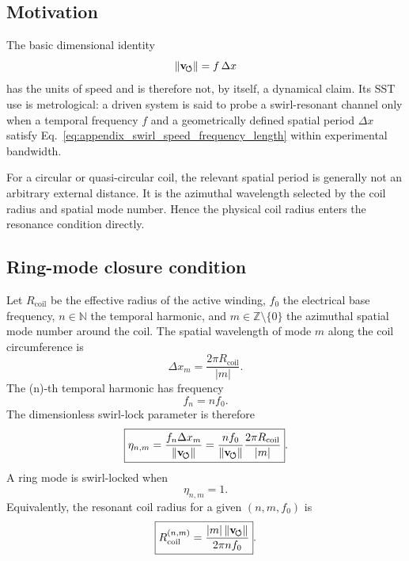 \subsection{Motivation}

The basic dimensional identity
\begin{equation}
\lVert\mathbf{v}_{\!\boldsymbol{\circlearrowleft}}\rVert = f\,\Delta x
\label{eq:appendix_swirl_speed_frequency_length}
\end{equation}
has the units of speed and is therefore not, by itself, a dynamical claim. Its SST use is metrological: a driven system is said to probe a swirl-resonant channel only when a temporal frequency $f$ and a geometrically defined spatial period $\Delta x$ satisfy Eq.~\eqref{eq:appendix_swirl_speed_frequency_length} within experimental bandwidth.

For a circular or quasi-circular coil, the relevant spatial period is generally not an arbitrary external distance. It is the azimuthal wavelength selected by the coil radius and spatial mode number. Hence the physical coil radius enters the resonance condition directly.

\subsection{Ring-mode closure condition}

Let $R_{\mathrm{coil}}$ be the effective radius of the active winding, $f_0$ the electrical base frequency, $n\in\mathbb{N}$ the temporal harmonic, and $m\in\mathbb{Z}\setminus\{0\}$ the azimuthal spatial mode number around the coil. The spatial wavelength of mode $m$ along the coil circumference is
\begin{equation}
\Delta x_m
=
\frac{2\pi R_{\mathrm{coil}}}{|m|}.
\label{eq:appendix_spatial_period}
\end{equation}
The (n)-th temporal harmonic has frequency
\begin{equation}
f_n = n f_0.
\end{equation}
The dimensionless swirl-lock parameter is therefore
\begin{equation}
\boxed{
\eta_{n,m}
=
\frac{f_n \Delta x_m}{\lVert\mathbf{v}_{\!\boldsymbol{\circlearrowleft}}\rVert}
=
\frac{n f_0}{\lVert\mathbf{v}_{\!\boldsymbol{\circlearrowleft}}\rVert}
\frac{2\pi R_{\mathrm{coil}}}{|m|}
}.
\label{eq:appendix_eta_nm}
\end{equation}
A ring mode is swirl-locked when
\begin{equation}
\boxed{\eta_{n,m}=1.}
\label{eq:appendix_eta_lock}
\end{equation}
Equivalently, the resonant coil radius for a given $(n,m,f_0)$ is
\begin{equation}
\boxed{
R_{\mathrm{coil}}^{(n,m)}
=
\frac{|m|\,\lVert\mathbf{v}_{\!\boldsymbol{\circlearrowleft}}\rVert}{2\pi n f_0}
}.
\label{eq:appendix_resonant_radius}
\end{equation}

